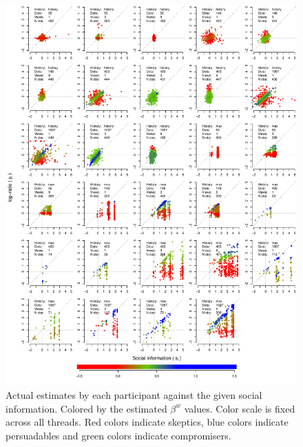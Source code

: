 \documentclass[9pt,a4paper,twocolumn,lineno]{article}
\begin{document}
\begin{figure}%
\centering
	\hspace{-30px}\includegraphics[width=1\linewidth]{allinfo}
	\caption{Actual estimates by each participant against the given social information. Colored by the estimated $\beta^w$ values. Color scale is fixed across all threads. Red colors indicate skeptics, blue colors indicate persuadables and green colors indicate compromisers.}\label{fig: social info vs estimates}
\end{figure}
\newpage
\end{document}
